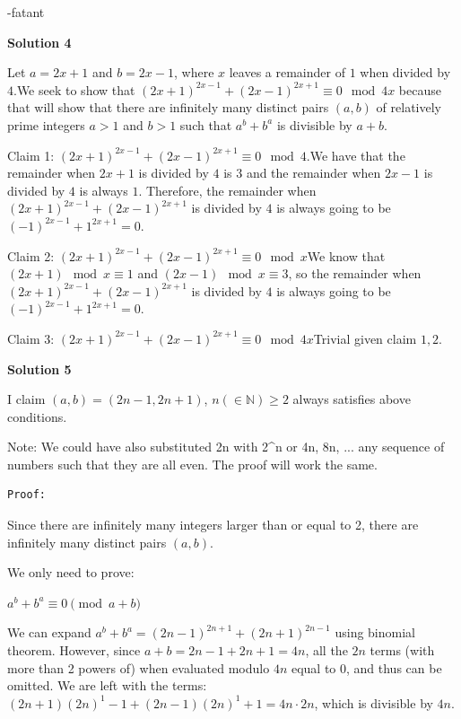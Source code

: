 \begin{enumerate}
 -fatant

 



\textbf{Solution 4}

Let $a = 2x + 1$ and $b = 2x-1$, where $x$ leaves a remainder of $1$ when divided by $4$.We seek to show that $(2x+1)^{2x-1} + (2x-1)^{2x+1} \equiv 0 \mod 4x$ because that will show that there are infinitely many distinct pairs $(a,b)$ of relatively prime integers $a>1$ and $b>1$ such that $a^b+b^a$ is divisible by $a+b$.

 Claim 1: $(2x+1)^{2x-1} + (2x-1)^{2x+1} \equiv 0 \mod 4$.We have that the remainder when $2x+1$ is divided by $4$ is $3$ and the remainder when $2x-1$ is divided by $4$ is always $1$. Therefore, the remainder when $(2x+1)^{2x-1} + (2x-1)^{2x+1}$ is divided by $4$ is always going to be $(-1)^{2x-1} + 1^{2x+1} = 0$.

 Claim 2: $(2x+1)^{2x-1} + (2x-1)^{2x+1} \equiv 0 \mod x$We know that $(2x+1) \mod x \equiv 1$ and $(2x-1) \mod x \equiv 3$, so the remainder when $(2x+1)^{2x-1} + (2x-1)^{2x+1}$ is divided by $4$ is always going to be $(-1)^{2x-1} + 1^{2x+1} = 0$.

 Claim 3: $(2x+1)^{2x-1} + (2x-1)^{2x+1} \equiv 0 \mod 4x$Trivial given claim $1,2$. $\boxed{}$




\textbf{Solution 5}

I claim $(a,b) = (2n-1,2n+1)$,  $n (\in \mathbb{N}) \geq 2$ always satisfies above conditions.

 Note: We could have also substituted 2n with 2\textasciicircum{}n or 4n, 8n, ... any sequence of numbers such that they are all even. The proof will work the same.

 \begin{verbatim}
Proof:
\end{verbatim}

Since there are infinitely many integers larger than or equal to 2, there are infinitely many distinct pairs $(a,b)$. 

 We only need to prove:

 $a^b+b^a \equiv 0 \pmod{a+b}$

 We can expand $a^b + b^a = (2n-1)^{2n+1} + (2n+1)^{2n-1}$ using binomial theorem. However, since $a + b = 2n-1 + 2n+1 = 4n$, all the $2n$ terms (with more than 2 powers of) when evaluated modulo $4n$ equal to 0, and thus can be omitted. We are left with the terms: $(2n+1)(2n)^1-1+(2n-1)(2n)^1+1 = 4n \cdot 2n$, which is divisible by $4n$.


\end{enumerate}
